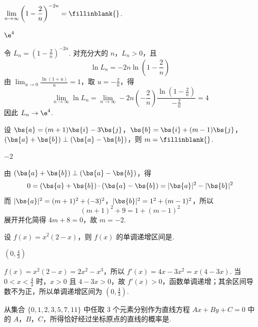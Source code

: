 \setcounter{probnum}{12}
\begin{problem}[B]
\(\displaystyle\lim_{n\to\infty}\left(1-\frac{2}{n}\right)^{-2n}=\fillinblank{}\).
\end{problem}

\begin{answer}
\(\e^4\)
\end{answer}

\begin{solution}
令 \(L_n=\left(1-\frac2n\right)^{-2n}\). 对充分大的 \(n\)，\(L_n>0\)，且
\[
\ln L_n=-2n\ln\left(1-\frac2n\right)
\]
由 \(\displaystyle\lim_{u\to0}\frac{\ln(1+u)}{u}=1\)，取 \(u=-\frac2n\)，得
\[
\lim_{n\to\infty}\ln L_n
=\lim_{n\to\infty}-2n\left(-\frac2n\right)\frac{\ln\left(1-\frac2n\right)}{-\frac2n}=4
\]
因此 \(L_n\to\e^4\).
\end{solution}

\begin{problem}[B]
设 \(\bs{a}=(m+1)\bs{i}-3\bs{j}\)，\(\bs{b}=\bs{i}+(m-1)\bs{j}\)，\(\left(\bs{a}+\bs{b}\right)\perp\left(\bs{a}-\bs{b}\right)\)，则 \(m=\fillinblank{}\).
\end{problem}

\begin{answer}
\(-2\)
\end{answer}

\begin{solution}
由 \((\bs{a}+\bs{b})\perp(\bs{a}-\bs{b})\)，得
\[
0=(\bs{a}+\bs{b})\cdot(\bs{a}-\bs{b})=|\bs{a}|^2-|\bs{b}|^2
\]
而 \(|\bs{a}|^2=(m+1)^2+(-3)^2\)，\(|\bs{b}|^2=1^2+(m-1)^2\)，所以
\[
(m+1)^2+9=1+(m-1)^2
\]
展开并化简得 \(4m+8=0\)，故 \(m=-2\).
\end{solution}

\begin{problem}[B]
设 \(f(x)=x^2(2-x)\)，则 \(f(x)\) 的单调递增区间是\fillinblank{}.
\end{problem}

\begin{answer}
\(\left(0,\frac{4}{3}\right)\)
\end{answer}

\begin{solution}
\(f(x)=x^2(2-x)=2x^2-x^3\)，所以
\(f'(x)=4x-3x^2=x(4-3x)\).
当 \(0<x<\frac43\) 时，\(x>0\) 且 \(4-3x>0\)，故 \(f'(x)>0\)，函数单调递增；其余区间导数不为正，所以单调递增区间为 \(\left(0,\frac43\right)\).
\end{solution}

\begin{problem}[B]
从集合 \(\{0,1,2,3,5,7,11\}\) 中任取 \(3\) 个元素分别作为直线方程 \(Ax+By+C=0\) 中的 \(A\)，\(B\)，\(C\)，所得恰好经过坐标原点的直线的概率是\fillinblank{}.
\end{problem}


